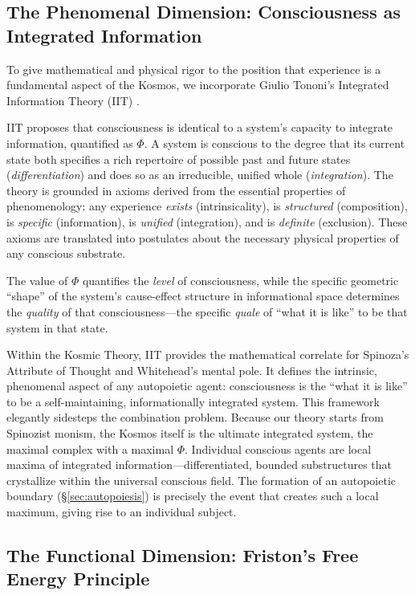 \documentclass[12pt,a4paper]{article}
\begin{document}
\subsection{The Phenomenal Dimension: Consciousness as Integrated Information}
\label{sec:iit}

To give mathematical and physical rigor to the position that experience is
a fundamental aspect of the Kosmos, we incorporate Giulio Tononi's
Integrated Information Theory (IIT) \citep{tononi2004,tononi2015,
tononi2016}.

IIT proposes that consciousness is identical to a system's capacity to
integrate information, quantified as $\Phi$.  A system is conscious to the
degree that its current state both specifies a rich repertoire of possible
past and future states (\emph{differentiation}) and does so as an
irreducible, unified whole (\emph{integration}).  The theory is grounded in
axioms derived from the essential properties of phenomenology: any
experience \emph{exists} (intrinsicality), is \emph{structured}
(composition), is \emph{specific} (information), is \emph{unified}
(integration), and is \emph{definite} (exclusion).  These axioms are
translated into postulates about the necessary physical properties of any
conscious substrate.

The value of $\Phi$ quantifies the \emph{level} of consciousness, while
the specific geometric ``shape'' of the system's cause-effect structure in
informational space determines the \emph{quality} of that
consciousness---the specific \emph{quale} of ``what it is like'' to be
that system in that state.

Within the Kosmic Theory, IIT provides the mathematical correlate for
Spinoza's Attribute of Thought and Whitehead's mental pole.  It defines
the intrinsic, phenomenal aspect of any autopoietic agent: consciousness
is the ``what it is like'' to be a self-maintaining, informationally
integrated system.  This framework elegantly sidesteps the combination
problem.  Because our theory starts from Spinozist monism, the Kosmos
itself is the ultimate integrated system, the maximal complex with a
maximal $\Phi$.  Individual conscious agents are local maxima of
integrated information---differentiated, bounded substructures that
crystallize within the universal conscious field.  The formation of an
autopoietic boundary (\S\ref{sec:autopoiesis}) is precisely the event that
creates such a local maximum, giving rise to an individual subject.

\subsection{The Functional Dimension: Friston's Free Energy Principle}
\label{sec:fep}
\end{document}
